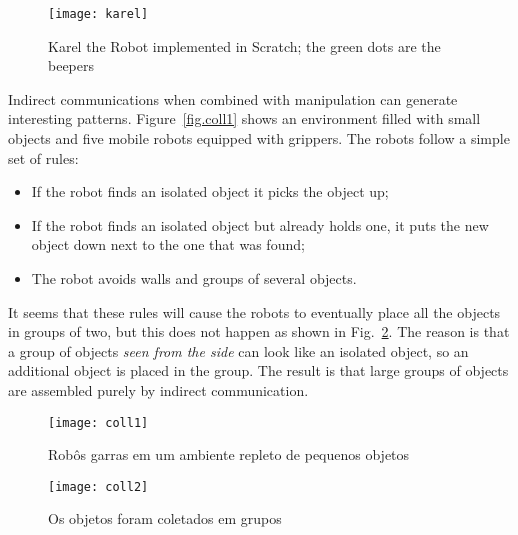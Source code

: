 \begin{figure}
\begin{center}
\texttt{[image: karel]}
\end{center}
\caption{Karel the Robot implemented in Scratch; the green dots are the beepers}\label{fig.karel}
\end{figure}

Indirect communications when combined with manipulation can generate interesting patterns. Figure~\ref{fig.coll1} shows an environment filled with small objects and five mobile robots equipped with grippers. The robots follow a simple set of rules:
\begin{itemize}
\item If the robot finds an isolated object it picks the object up;
\item If the robot finds an isolated object but already holds one, it puts the new object down next to the one that was found;
\item The robot avoids walls and groups of several objects.
\end{itemize}
It seems that these rules will cause the robots to eventually place all the objects in groups of two, but this does not happen as shown in Fig.~\ref{fig.coll2}. The reason is that a group of objects \emph{seen from the side} can look like an isolated object, so an additional object is placed in the group. The result is that large groups of objects are assembled purely by indirect communication.

\begin{figure}
\begin{minipage}{.45\textwidth}
\texttt{[image: coll1]}
\caption{Robôs garras em um ambiente repleto de pequenos objetos}
\label{fig.coll1}
\end{minipage}
\hspace{\fill}
\begin{minipage}{.45\textwidth}
\texttt{[image: coll2]}
\caption{Os objetos foram coletados em grupos}
\label{fig.coll2}
\end{minipage}
\end{figure}


